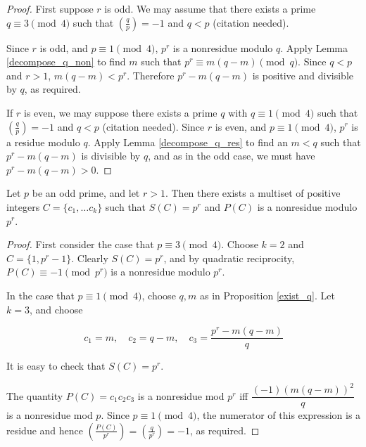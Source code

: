 \documentclass{article}
\begin{document}
\begin{proof}
  First suppose $r$ is odd. We may assume that there exists a prime
  $q \equiv 3 \pmod 4$ such that $\left( \frac{q}{p} \right) = -1$
  and $q < p$ (citation needed). 

  Since $r$ is odd, and $p \equiv 1 \pmod 4$, $p^r$ is a nonresidue
  modulo $q$. Apply Lemma \ref{decompose_q_non} to find $m$ such
  that $p^r \equiv m(q-m) \pmod q$. Since $q < p$ and $r > 1$,
  $m(q-m) < p^r$. Therefore $p^r - m(q-m)$ is positive and divisible
  by $q$, as required.

  If $r$ is even, we may suppose there exists a prime $q$ with $q
  \equiv 1 \pmod 4$ such that $\left( \frac{q}{p} \right) = -1$ and $q
  < p$ (citation needed). Since $r$ is even, and $p \equiv 1
  \pmod 4$, $p^r$ is a residue modulo $q$. Apply Lemma
  \ref{decompose_q_res} to find an $m < q$ such that $p^r - m(q-m)$ is
  divisible by $q$, and as in the odd case, we must have $p^r - m(q-m)
  > 0$.
\end{proof}
\begin{thm}
  \label{exist_decomp}
  Let $p$ be an odd prime, and let $r > 1$. Then there exists a
  multiset of positive integers $C = \{c_1, \ldots c_k\}$ such that
  $S(C) = p^r$ and $P(C)$ is a nonresidue modulo $p^r$.
\end{thm}
\begin{proof}
  First consider the case that $p \equiv 3 \pmod 4$. Choose $k = 2$
  and $C = \{1, p^r-1\}$. Clearly $S(C) = p^r$, and by quadratic
  reciprocity, $P(C) \equiv -1 \pmod p^r$ is a nonresidue modulo
  $p^r$.

  In the case that $p \equiv 1 \pmod 4$, choose $q,m$ as in
  Proposition \ref{exist_q}. Let $k=3$, and choose 

  \[c_1 = m, \quad c_2 =  q-m, \quad c_3 = \frac{p^r - m(q-m)}{q}\]

  It is easy to check that $S(C) = p^r$.

  The quantity $P(C) = c_1c_2c_3$ is a nonresidue mod $p^r$ iff
  $\dfrac{(-1)(m(q-m))^2}{q}$ is a nonresidue mod $p$. Since $p \equiv
  1 \pmod 4$, the numerator of this expression is a residue and hence
  $\left( \frac{P(C)}{p^r} \right) = \left( \frac{q}{p^r} \right) =
  -1$, as required.
\end{proof}
\end{document}
